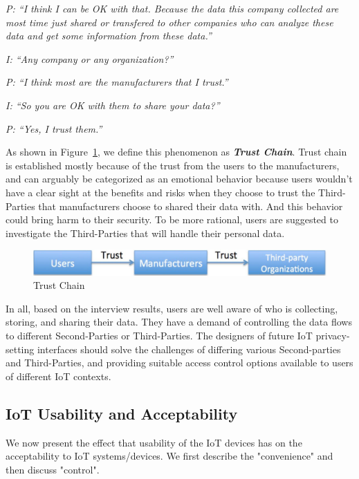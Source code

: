 \textit{P: ``I think I can be OK with that. Because the data this company collected are most time just shared or transfered to other companies who can analyze these data and get some information from these data.''\\}

\textit{I: ``Any company or any organization?''\\}

\textit{P: ``I think most are the manufacturers that I trust.''\\}

\textit{I: ``So you are OK with them to share your data?''\\}

\textit{P: ``Yes, I trust them.''\\}

As shown in Figure~\ref{fig:trustchain}, we define this phenomenon as \textit{\textbf{Trust Chain}}. Trust chain is established mostly because of the trust from the users to the manufacturers, and can arguably be categorized as an emotional behavior because users wouldn't have a clear sight at the benefits and risks when they choose to trust the Third-Parties that manufacturers choose to shared their data with. And this behavior could bring harm to their security. To be more rational, users are suggested to investigate the Third-Parties that will handle their personal data.

\begin{figure}
	\centering
	\includegraphics[width=0.75\columnwidth]{figures/trustchain.pdf}
	\caption{Trust Chain}
	\label{fig:trustchain}
\end{figure}

In all, based on the interview results, users are well aware of who is collecting, storing, and sharing their data. They have a demand of controlling the data flows to different Second-Parties or Third-Parties. The designers of future IoT privacy-setting interfaces should solve the challenges of differing various Second-parties and Third-Parties, and providing suitable access control options available to users of different IoT contexts.

\subsection{IoT Usability and Acceptability}
We now present the effect that usability of the IoT devices has on the acceptability to IoT systems/devices. We first describe the "convenience" and then discuss "control".

